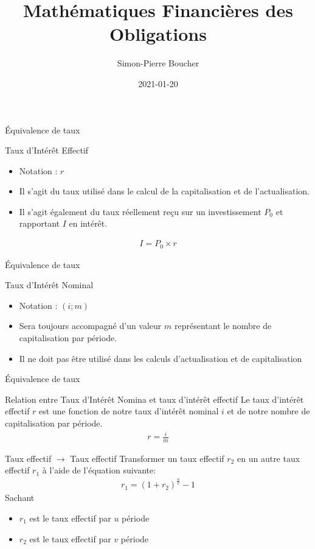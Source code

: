 \documentclass[11pt]{beamer}
\date{2021-01-20}
\author{Simon-Pierre Boucher}
\title{Mathématiques Financières des Obligations}
\institute{Université Laval}
\begin{document}
\begin{frame}
\titlepage
\end{frame}


\begin{frame}{Équivalence de taux}
\begin{block}{Taux d'Intérêt Effectif}
\begin{itemize}
\item Notation : $r$
\item Il s'agit du taux utilisé dans le calcul de la capitalisation et de l'actualisation. 
\item Il s'agit également du taux réellement reçu sur un investissement $P_0$ et rapportant $I$ en intérêt.
\end{itemize}
\begin{align*}
I=P_0 \times r
\end{align*}
\end{block}
\end{frame}


\begin{frame}{Équivalence de taux}
\begin{block}{Taux d'Intérêt Nominal}
\begin{itemize}
\item Notation : $(i;m)$
\item Sera toujours accompagné d'un valeur $m$ représentant le nombre de capitalisation par période.
\item Il ne doit pas être utilisé dans les calculs d’actualisation et de capitalisation
\end{itemize}
\end{block}
\end{frame}


\begin{frame}{Équivalence de taux}
\begin{block}{Relation entre Taux d'Intérêt Nomina et taux d'intérêt effectif}
Le taux d'intérêt effectif $r$ est une fonction de notre taux d'intérêt nominal $i$ et de notre nombre de capitalisation par période. 
\begin{align*}
r=\frac{i}{m}
\end{align*}
\end{block}
\end{frame}

\begin{frame}{Taux effectif $\rightarrow$ Taux effectif}
Transformer un taux effectif $r_2$ en un autre taux effectif $r_1$ à l'aide de l'équation suivante:
\begin{align*}
r_1 =(1+r_2)^{\frac{u}{v}}-1
\end{align*}
Sachant 
\begin{itemize}
\item $r_1$ est le taux effectif par $u$ période 
\item $r_2$ est le taux effectif par $v$ période 
\end{itemize}
\end{frame}
\end{document}
